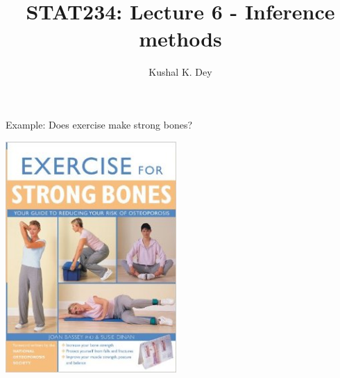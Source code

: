 \documentclass{beamer}\usepackage[]{graphicx}\usepackage[]{color}
\title{STAT234: Lecture 6 - Inference methods}
\author{Kushal K. Dey}
\date{}
\begin{document}





\begin{frame}{}
\maketitle
\end{frame}


\begin{frame}{Example: Does exercise make strong bones?}

\begin{center}
\includegraphics[width=6.5cm,height=7.3 cm]{exercise.jpg}
\end{center}

\end{frame}
\end{document}

